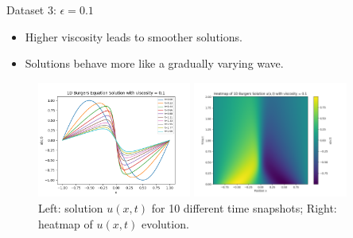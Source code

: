 \begin{secframe}

\begin{block}{Dataset 3: $\epsilon = 0.1$}
\begin{itemize}
  \item \small Higher viscosity leads to smoother solutions.
  \item \small Solutions behave more like a gradually varying wave.
\end{itemize}
\end{block}

\begin{figure}[h!]
    \centering
    \begin{minipage}[t]{0.48\linewidth}
        \centering
        \includegraphics[height=3.8cm]{images/burger/graphical_visualization_1DBurgers_visc_01.png}
    \end{minipage}\hfill
    \begin{minipage}[t]{0.48\linewidth}
        \centering
        \includegraphics[height=3.8cm]{images/burger/Heatmap_1DBurgers_visc_01.png}
    \end{minipage}
    \caption{\scriptsize Left: solution $u(x,t)$ for 10 different time snapshots; Right: heatmap of $u(x,t)$ evolution.}
\end{figure}

\end{secframe}

